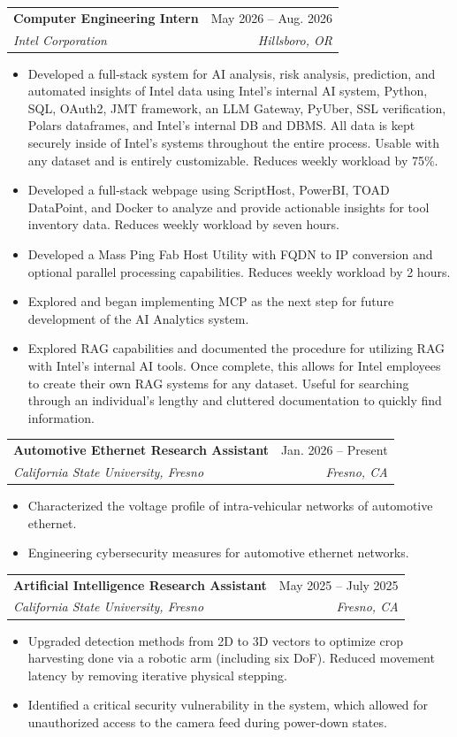 \documentclass[letterpaper,11pt]{article}
\makeatletter
\newcommand{\resumeItem}[1]{
  \item\small{
    {#1 \vspace{-2pt}}
  }
}
\newcommand{\resumeSubheading}[4]{
  \vspace{-2pt}\item
    \begin{tabular*}{0.97\textwidth}[t]{l@{\extracolsep{\fill}}r}
      \textbf{#1} & #2 \\
      \textit{\small#3} & \textit{\small #4} \\
    \end{tabular*}\vspace{-7pt}
}
\newcommand{\resumeSubSubheading}[2]{
    \item
    \begin{tabular*}{0.97\textwidth}{l@{\extracolsep{\fill}}r}
      \textit{\small#1} & \textit{\small #2} \\
    \end{tabular*}\vspace{-7pt}
}
\newcommand{\resumeSubHeadingListEnd}{\end{itemize}}
\newcommand{\resumeItemListStart}{\begin{itemize}}
\newcommand{\resumeItemListEnd}{\end{itemize}\vspace{-5pt}}
\makeatother
\begin{document}
    \resumeSubheading
      {Computer Engineering Intern}{May 2026 -- Aug. 2026}
      {Intel Corporation}{Hillsboro, OR}
      \resumeItemListStart
        \resumeItem{Developed a full-stack system for AI analysis, risk analysis, prediction, and automated insights of Intel data using Intel's internal AI system, Python, SQL, OAuth2, JMT framework, an LLM Gateway, PyUber, SSL verification, Polars dataframes, and Intel's internal DB and DBMS. All data is kept securely inside of Intel's systems throughout the entire process. Usable with any dataset and is entirely customizable. Reduces weekly workload by 75\%.}
        \resumeItem{Developed a full-stack webpage using ScriptHost, PowerBI, TOAD DataPoint, and Docker to analyze and provide actionable insights for tool inventory data. Reduces weekly workload by seven hours.}
        \resumeItem{Developed a Mass Ping Fab Host Utility with FQDN to IP conversion and optional parallel processing capabilities. Reduces weekly workload by 2 hours.}
        \resumeItem{Explored and began implementing MCP as the next step for future development of the AI Analytics system.}
        \resumeItem{Explored RAG capabilities and documented the procedure for utilizing RAG with Intel's internal AI tools. Once complete, this allows for Intel employees to create their own RAG systems for any dataset. Useful for searching through an individual's lengthy and cluttered documentation to quickly find information.}
      \resumeItemListEnd
      

    \resumeSubheading
      {Automotive Ethernet Research Assistant}{Jan. 2026 -- Present}
      {California State University, Fresno}{Fresno, CA}
      \resumeItemListStart
        \resumeItem{Characterized the voltage profile of intra-vehicular networks of automotive ethernet.}
        \resumeItem{Engineering cybersecurity measures for automotive ethernet networks.}
    \resumeItemListEnd

    \resumeSubheading
      {Artificial Intelligence Research Assistant}{May 2025 -- July 2025}
      {California State University, Fresno}{Fresno, CA}
      \resumeItemListStart
        \resumeItem{Upgraded detection methods from 2D to 3D vectors to optimize crop harvesting done via a robotic arm (including six DoF). Reduced movement latency by removing iterative physical stepping.}
        \resumeItem{Identified a critical security vulnerability in the system, which allowed for unauthorized access to the camera feed during power-down states.}
    \resumeItemListEnd
\end{document}
